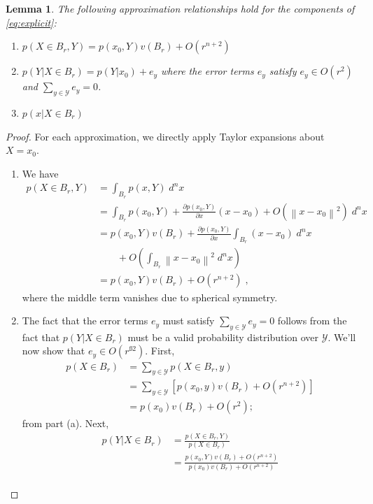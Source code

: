 \documentclass[english]{scrartcl}
\newtheorem{lm}{Lemma}
\newcommand{\norm}[1]{\left\lVert#1\right\rVert}
\begin{document}
	\begin{lm} \label{approximations}
		The following approximation relationships hold for the components of \eqref{eq:explicit}:
		\begin{enumerate}[label=\emph{(\alph*)}]
			\item $p(X\in B_r,Y) = p(x_0, Y) v(B_r) + O(r^{n+2})$
			\item $p(Y|X \in B_r) = p(Y|x_0) + e_y$ where the error terms $e_y$ satisfy $e_y \in O(r^{2})$ and $\sum_{y \in \mathcal{Y}} e_y = 0$. 
			\item $p(x|X \in B_r) $
		\end{enumerate}
	\end{lm}
	\begin{proof}
		For each approximation,  we directly apply Taylor expansions about $X = x_0$. 
		\begin{enumerate}[label=(\alph*)]
			\item We have 
				\begin{align}
					p(X\in B_r, Y) &= \int_{B_r} p(x,Y) \; d^nx \\
					&= \int_{B_r} p(x_0,Y) + \frac{\partial p(x_0, Y)}{\partial x}(x - x_0) + O(\norm{x - x_0}^2) \; d^nx \\
					&= p(x_0, Y)v(B_r) +  \frac{\partial p(x_0, Y)}{\partial x} \int_{B_r} (x - x_0)\; d^nx  \\
					&\quad \quad+ O\left(\int_{B_r} \norm{x - x_0}^2\; d^nx\right) \\
					&= p(x_0, Y)v(B_r) + O(r^{n+2})\;,
				\end{align}
				where the middle term vanishes due to spherical symmetry. 
			\item The fact that the error terms $e_y$ must satisfy $\sum_{y \in \mathcal{Y}} e_y = 0$ follows from the fact that $p(Y|X \in B_r)$ must be a valid probability distribution over $\mathcal{Y}$. We'll now show that $e_y \in O(r^{ß2})$. First, 
				\begin{align}
					p(X \in B_r) &= \sum_{y\in \mathcal{Y}} p(X \in B_r, y)  \\
					&= \sum_{y\in \mathcal{Y}} \left[p(x_0, y)v(B_r) + O(r^{n+2}) \right] \\
					&= p(x_0)v(B_r) + O(r^{2});\,
				\end{align}
			from part (a). Next, 
				\begin{align}
					p(Y|X \in B_r) &= \frac{p(X\in B_r, Y)}{p(X \in B_r)} \\
					&= \frac{p(x_0, Y)v(B_r) + O(r^{n+2})}{p(x_0)v(B_r) + O(r^{n+2})} \\

\end{align}
\end{enumerate}
\end{proof}
\end{document}
